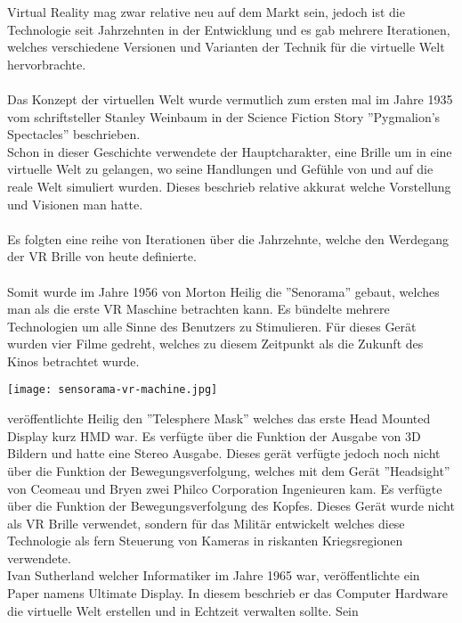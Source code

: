
Virtual Reality mag zwar relative neu auf dem Markt sein, jedoch ist die Technologie seit Jahrzehnten in der Entwicklung und es gab mehrere
Iterationen, welches verschiedene Versionen und Varianten der Technik für die virtuelle Welt hervorbrachte. \\ \\
Das Konzept der virtuellen Welt wurde vermutlich zum ersten mal im Jahre 1935 vom schriftsteller Stanley Weinbaum in der Science Fiction
Story ''Pygmalion's Spectacles'' beschrieben.\\ 
Schon in dieser Geschichte verwendete der Hauptcharakter, eine Brille um in eine virtuelle Welt zu gelangen, wo seine Handlungen
und Gefühle von und auf die reale Welt simuliert wurden. Dieses beschrieb relative akkurat welche Vorstellung und Visionen man
hatte.\cite{virtualrealityhistory}\\ \\
Es folgten eine reihe von Iterationen über die Jahrzehnte, welche den Werdegang der VR Brille von heute definierte. \\ \\
Somit wurde im Jahre 1956 von Morton Heilig die ''Senorama'' gebaut, welches man als die erste VR Maschine betrachten kann. Es bündelte
mehrere Technologien um alle Sinne des Benutzers zu Stimulieren. Für dieses Gerät wurden vier Filme gedreht, welches zu diesem Zeitpunkt
als die Zukunft des Kinos betrachtet wurde.\cite{virtualrealityhistory} \\
\begin{center}
    \texttt{[image: sensorama-vr-machine.jpg]}
\end{center}
\newpage {} veröffentlichte Heilig den ''Telesphere Mask'' welches das erste Head Mounted Display kurz HMD war. Es verfügte über die
Funktion der Ausgabe von 3D Bildern und hatte eine Stereo Ausgabe. Dieses gerät verfügte jedoch noch nicht über die Funktion der
Bewegungsverfolgung, welches mit dem Gerät ''Headsight'' von Ceomeau und Bryen zwei Philco Corporation Ingenieuren kam. Es
verfügte über die Funktion der Bewegungsverfolgung des Kopfes. Dieses Gerät wurde nicht als VR Brille verwendet, sondern für das
Militär entwickelt welches diese Technologie als fern Steuerung von Kameras in riskanten Kriegsregionen verwendete.\cite{virtualrealityhistory}\\
Ivan Sutherland welcher Informatiker im Jahre 1965 war, veröffentlichte ein Paper namens Ultimate Display. In diesem beschrieb er
das Computer Hardware die virtuelle Welt erstellen und in Echtzeit verwalten sollte. Sein
